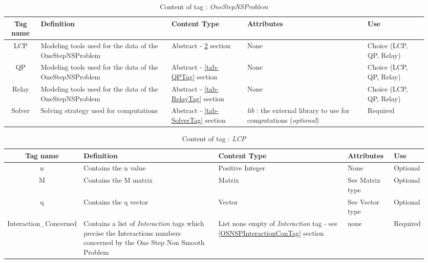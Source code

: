 \begin{table}[!hbp]
\begin{center}
\begin{tabular}{|c|p{4cm}|p{2cm}|p{2cm}|p{2cm}|}
\hline
\bf{Tag name} & \bf{Definition} & \bf{Content Type} & \bf{Attributes} & \bf{Use}
\\\hline
\hline
LCP	  & Modeling tools used for the data of the OneStepNSProblem & Abstract - \ref{tab-LCPTag} section & None &  Choice (LCP, QP, Relay) \\
QP	  & Modeling tools used for the data of the OneStepNSProblem & Abstract - \ref{tab-QPTag} section & None &  Choice (LCP, QP, Relay) \\
Relay & Modeling tools used for the data of the OneStepNSProblem & Abstract - \ref{tab-RelayTag} section & None &  Choice (LCP, QP, Relay) \\
\hline
Solver & Solving strategy used for computations & Abstract - \ref{tab-SolverTag} section & \textit{lib} : the external library to use for computations (\textit{optional}) &  Required \\
\hline
\hline
\end{tabular}
\end{center}
\caption{Content of tag : \textit{OneStepNSProblem}}
\label{tab-OSNSP}
\end{table}




\begin{table}[!hbp]
\begin{center}
\begin{tabular}{|c|p{4cm}|p{2cm}|p{2cm}|p{2cm}|}
\hline
\bf{Tag name} & \bf{Definition} & \bf{Content Type} & \bf{Attributes} & \bf{Use}
\\\hline
\hline
n		  & Contains the n value & Positive Integer & None &  Optional \\
\hline
M		  & Contains the M matrix & Matrix & See Matrix type &  Optional \\
\hline
q		  & Contains the q vector & Vector & See Vector type &  Optional \\
\hline
Interaction\_Concerned	  & Contains a list of \textit{Interaction} tags which precise the Interactions numbers concerned by the One Step Non Smooth Problem & List none empty of \textit{Interaction} tag - see \ref{OSNSPInteractionConTag} section& none &  Required \\
\hline
\end{tabular}
\end{center}
\caption{Content of tag : \textit{LCP}}
\label{tab-LCPTag}
\end{table}




